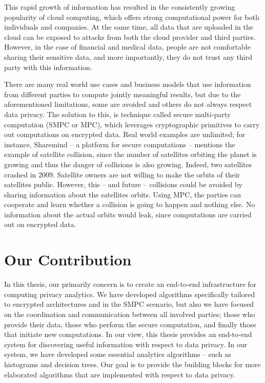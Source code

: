 

This rapid growth of information has resulted in the consistently growing popularity of cloud computing, which offers strong computational power for both individuals and companies.
At the same time, all data that are uploaded in the cloud can be exposed to attacks from both the cloud provider and third parties.
However, in the case of financial and medical data, people are not comfortable sharing their sensitive data, and more importantly, they do not trust any third party with this information.

There are many real world use cases and business models that use information from different parties to compute jointly meaningful results, but due to the aforementioned limitations, some are avoided and others do not always respect data privacy.
The solution to this, is technique called secure multi-party computation (SMPC or MPC), which leverages cryptographic primitives to carry out computations on encrypted data.
Real world examples are unlimited; for instance, Sharemind -- a platform for secure computations -- mentions the example of satellite collision, since the number of satellites orbiting the planet is growing and thus the danger of collisions is also growing.
Indeed, two satellites crashed in 2009.
Satellite owners are not willing to make the orbits of their satellites public.
However, this -- and future -- collisions could be avoided by sharing information about the satellites orbits.
Using MPC, the parties can cooperate and learn whether a collision is going to happen and nothing else.
No information about the actual orbits would leak, since computations are carried out on encrypted data.



\section{Our Contribution}\label{s:our-contribution}
In this thesis, our primarily concern is to create an end-to-end infrastructure for computing privacy analytics.
We have developed algorithms specifically tailored to encrypted architectures and in the SMPC scenario, but also we have focused on the coordination and communication between all involved parties; those who provide their data, those who perform the secure computation, and finally those that initiate new computations.
In our view, this thesis provides an end-to-end system for discovering useful information with respect to data privacy.
In our system, we have developed some essential analytics algorithms -- such as histograms and decision trees.
Our goal is to provide the building blocks for more elaborated algorithms that are implemented with respect to data privacy.


